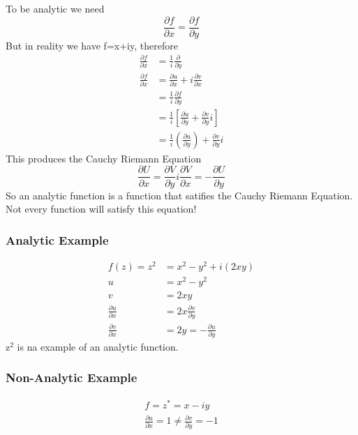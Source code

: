 \documentclass{article}
\newcommand{\be}{\begin{equation}}
\newcommand{\ee}{\end{equation}}
\newcommand{\pd}{\partial}
\begin{document}
To be analytic we need 
\be
\frac{\pd f}{\pd x} = \frac{\pd f}{\pd y}
\ee
But in reality we have f=x+iy, therefore
\be
\begin{split}
    \frac{\pd f}{\pd x} &= \frac{1}{i}\frac{\pd}{\pd y}\\
    \frac{\partial f}{\partial x} &= \frac{\partial u}{\partial x}+ i\frac{\partial v}{\partial x}\\
    &= \frac{1}{i}\frac{\partial f}{\partial y}\\
    &= \frac{1}{i}\left[\frac{\partial u}{\partial y}+\frac{\partial v}{\partial y} i\right] \\
    &= \frac{1}{i}\left(\frac{\partial u}{\partial y}\right)+\frac{\partial v}{\partial y} i
\end{split}
\ee
This produces the Cauchy Riemann Equation
\be
\frac{\pd U}{\pd x} = \frac{\pd V}{\pd y}i\frac{\pd V}{\pd x} = -\frac{\pd U}{\pd y}
\ee
So an analytic function is a function that satifies the Cauchy Riemann Equation.
Not every function will satisfy this equation!

\subsubsection*{Analytic Example}
\be
\begin{split}
 f(z)=z^2 &= x^2 - y^2 + i(2xy) \\
 u &= x^2-y^2\\
 v &=2xy \\
 \frac{\partial u}{\partial x} &= 2x \frac{\partial v}{\partial y}\\
\frac{\partial v}{\partial x} &=2y = -\frac{\partial u}{\partial y}
\end{split}
\ee
z$^2$ is na example of an analytic function. 

\subsubsection*{Non-Analytic Example}
\be
\begin{split}
    f=z^*=x-iy  \\
\frac{\partial u}{\partial x} = 1 \neq \frac{\partial v}{\partial y} = -1
\end{split}
\ee
\end{document}
